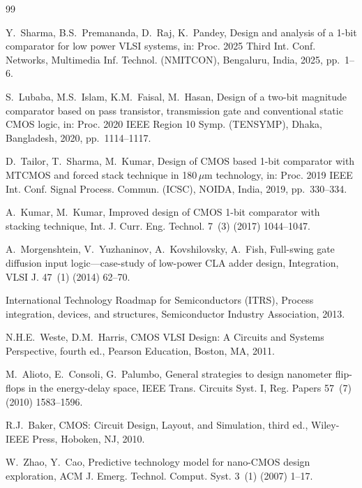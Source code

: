 \documentclass[final,5p,times,twocolumn]{elsarticle}
\begin{document}
\begin{thebibliography}{99}

Y.~Sharma, B.S.~Premananda, D.~Raj, K.~Pandey, Design and analysis of a 1-bit comparator for low power VLSI systems, in: Proc. 2025 Third Int. Conf. Networks, Multimedia Inf. Technol. (NMITCON), Bengaluru, India, 2025, pp.~1--6.

S.~Lubaba, M.S.~Islam, K.M.~Faisal, M.~Hasan, Design of a two-bit magnitude comparator based on pass transistor, transmission gate and conventional static CMOS logic, in: Proc. 2020 IEEE Region 10 Symp. (TENSYMP), Dhaka, Bangladesh, 2020, pp.~1114--1117.

D.~Tailor, T.~Sharma, M.~Kumar, Design of CMOS based 1-bit comparator with MTCMOS and forced stack technique in 180\,$\mu$m technology, in: Proc. 2019 IEEE Int. Conf. Signal Process. Commun. (ICSC), NOIDA, India, 2019, pp.~330--334.

A.~Kumar, M.~Kumar, Improved design of CMOS 1-bit comparator with stacking technique, Int. J. Curr. Eng. Technol. 7~(3) (2017) 1044--1047.

A.~Morgenshtein, V.~Yuzhaninov, A.~Kovshilovsky, A.~Fish, Full-swing gate diffusion input logic---case-study of low-power CLA adder design, Integration, VLSI J. 47~(1) (2014) 62--70.

International Technology Roadmap for Semiconductors (ITRS), Process integration, devices, and structures, Semiconductor Industry Association, 2013.

N.H.E.~Weste, D.M.~Harris, CMOS VLSI Design: A Circuits and Systems Perspective, fourth ed., Pearson Education, Boston, MA, 2011.

M.~Alioto, E.~Consoli, G.~Palumbo, General strategies to design nanometer flip-flops in the energy-delay space, IEEE Trans. Circuits Syst. I, Reg. Papers 57~(7) (2010) 1583--1596.

R.J.~Baker, CMOS: Circuit Design, Layout, and Simulation, third ed., Wiley-IEEE Press, Hoboken, NJ, 2010.

W.~Zhao, Y.~Cao, Predictive technology model for nano-CMOS design exploration, ACM J. Emerg. Technol. Comput. Syst. 3~(1) (2007) 1--17.


\end{thebibliography}
\end{document}
